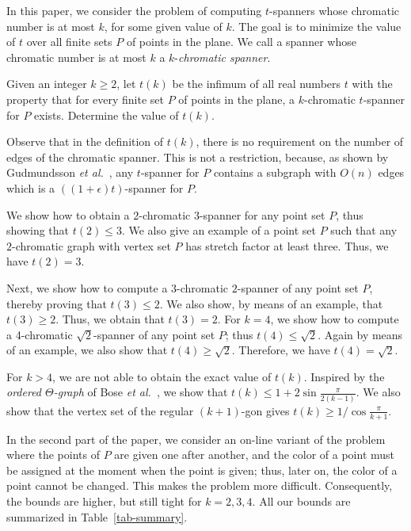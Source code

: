 \documentclass[pdftex,leqno,fleqn,12pts]{llncs}
\begin{document}
In this paper, we consider the problem of computing $t$-spanners whose 
chromatic number is at most $k$, for some given value of $k$. The 
goal is to minimize the value of $t$ over all finite sets $P$ of 
points in the plane. We call a spanner whose chromatic number is at most 
$k$ a $k$-\emph{chromatic spanner}.

\begin{problem}
\label{prob-k-col}
Given an integer $k \geq 2$, let $t(k)$ be the infimum of all real
numbers $t$ with the property that for every finite set $P$ of points in 
the plane, a $k$-chromatic $t$-spanner for $P$ exists. Determine 
the value of $t(k)$.
\end{problem}

Observe that in the definition of $t(k)$, there is no requirement on 
the number of edges of the chromatic spanner. This is not a restriction, 
because, as shown by Gudmundsson \emph{et al.}~\cite{glns-adogg-02}, 
any $t$-spanner for $P$ contains a subgraph with $O(n)$ edges which 
is a $((1+\epsilon)t)$-spanner for $P$.    

We show 
how to obtain a $2$-chromatic $3$-spanner for any point set $P$, 
thus showing that $t(2) \leq 3$. 
We also give an example of a point set $P$ such that any $2$-chromatic 
graph with vertex set $P$ has stretch factor at least three. Thus, 
we have $t(2)=3$. 

Next, we show how to compute a $3$-chromatic $2$-spanner of any point set $P$,
thereby proving that $t(3) \leq 2$. 
We also show, by means of an example, that $t(3) \geq 2$. Thus, 
we obtain that $t(3)=2$.  For $k=4$, we show how to compute a 4-chromatic $\sqrt{2}$-spanner of any point set $P$; 
thus  $t(4) \leq \sqrt{2}$.      
Again by means of an example, we also show that $t(4) \geq \sqrt{2}$. 
Therefore, we have $t(4) = \sqrt{2}$. 

For $k>4$, we are not able to obtain the exact value of $t(k)$. 
Inspired by the \emph{ordered $\Theta$-graph} of 
Bose \emph{et al.}~\cite{bose04a}, we show that 
$t(k) \leq 1 + 2 \sin \frac{\pi}{2(k-1)}$. We also show that the 
vertex set of the regular $(k+1)$-gon gives 
$t(k) \geq 1 / \cos \frac{\pi}{k+1}$. 

In the second part of the paper, we consider an on-line variant of the 
problem where the points of $P$ are given one after another, and the 
color of a point must be assigned at the moment when the point is given; 
thus, later on, the color of a point cannot be changed.
This makes the problem more difficult.
Consequently, the bounds are higher, but still tight for $k=2,3,4$. All our bounds are 
summarized in Table~\ref{tab-summary}.
\end{document}
